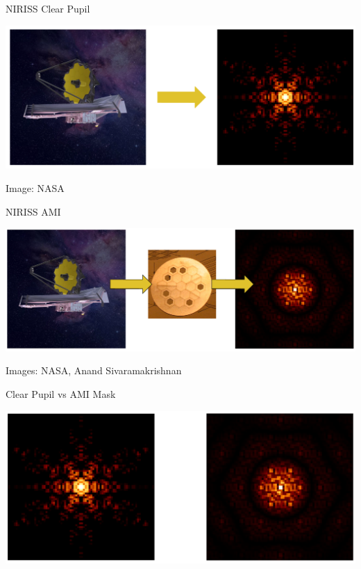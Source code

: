 \documentclass[10pt]{beamer}
\begin{document}
\begin{frame}{NIRISS Clear Pupil}

  \begin{center}
    \includegraphics[width=\linewidth]{figures/webb_and_psf.png}
  \end{center}

  \footnotesize Image: NASA
\end{frame}

\begin{frame}{NIRISS AMI}

  \begin{center}
    \includegraphics[width=\linewidth]{figures/webb_and_ami.png}
  \end{center}

  \footnotesize Images: NASA, Anand Sivaramakrishnan
\end{frame}

\begin{frame}{Clear Pupil vs AMI Mask}
  \begin{center}
    \includegraphics[width=\linewidth]{figures/clear_vs_ami.png}
  \end{center}
\end{frame}
\end{document}
